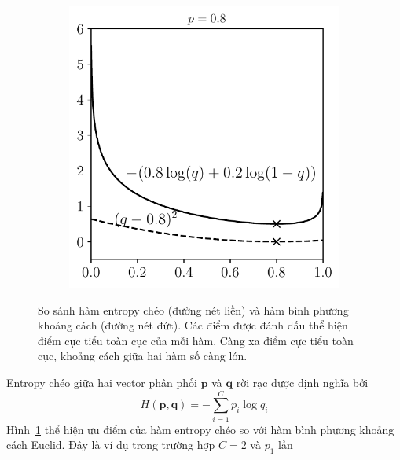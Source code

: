 \begin{figure}[t]
\begin{subfigure}{0.325\textwidth}
    \caption{}
    \end{subfigure}
    \begin{subfigure}{0.325\textwidth}
    \includegraphics[width=0.99\linewidth]{Chapters/05_NeuralNetworks/13_softmax/crossentropy3.pdf}
    \caption{}
    \end{subfigure}

    \caption{
    So sánh hàm entropy chéo (đường nét liền) và hàm bình phương khoảng cách
    (đường nét đứt). Các điểm được đánh dấu thể hiện điểm cực tiểu toàn cục
    của mỗi hàm. Càng xa điểm cực tiểu toàn cục, khoảng cách giữa hai hàm số
    càng lớn. }
    \label{fig:13_4}
\end{figure}
Entropy chéo giữa hai vector phân phối $\mathbf{p}$ và $\mathbf{q}$ rời rạc 
được định nghĩa bởi 
\begin{equation} 
\label{eqn:13_1}
H(\mathbf{p}, \mathbf{q}) =-\sum_{i=1}^C p_i \log q_i
\end{equation} 
Hình~\ref{fig:13_4} thể hiện ưu điểm của hàm entropy chéo so với hàm bình
phương khoảng cách Euclid. Đây là ví dụ trong trường hợp $C = 2$ và $p_1$ lần
